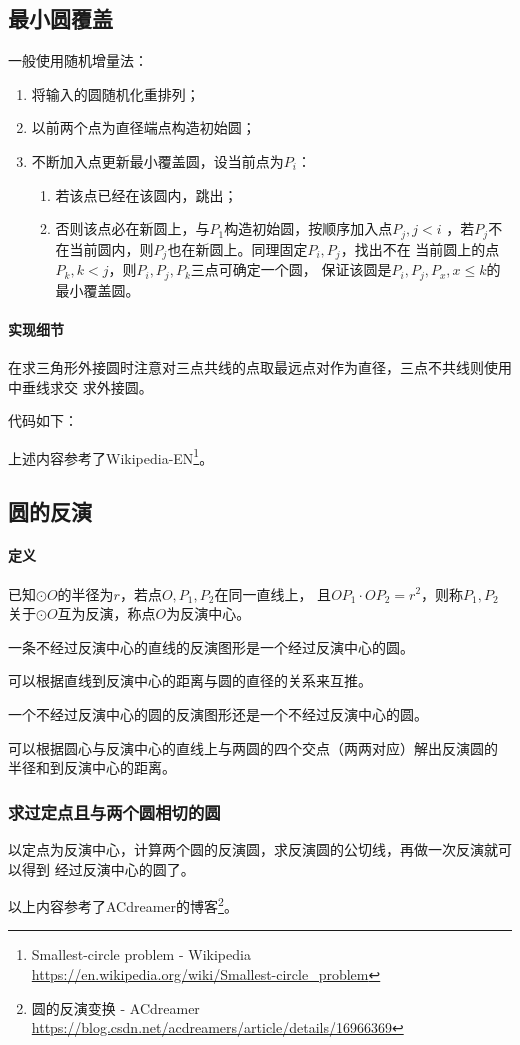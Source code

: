 \subsection{最小圆覆盖}
一般使用随机增量法：
\begin{enumerate}
	\item 将输入的圆随机化重排列；
	\item 以前两个点为直径端点构造初始圆；
	\item 不断加入点更新最小覆盖圆，设当前点为$P_i$：
	\begin{enumerate}
		\item 若该点已经在该圆内，跳出；
		\item 否则该点必在新圆上，与$P_1$构造初始圆，按顺序加入点$P_j,j<i$
		，若$P_j$不在当前圆内，则$P_j$也在新圆上。同理固定$P_i,P_j$，找出不在
		当前圆上的点$P_k,k<j$，则$P_i,P_j,P_k$三点可确定一个圆，
		保证该圆是$P_i,P_j,P_x,x\leq k$的最小覆盖圆。
	\end{enumerate}
\end{enumerate}

\paragraph{实现细节}
在求三角形外接圆时注意对三点共线的点取最远点对作为直径，三点不共线则使用中垂线求交
求外接圆。

代码如下：


上述内容参考了Wikipedia-EN\footnote{
	Smallest-circle problem - Wikipedia\\
	\url{https://en.wikipedia.org/wiki/Smallest-circle\_problem}
}。
\subsection{圆的反演}
\paragraph{定义} 已知$\odot O$的半径为$r$，若点$O,P_1,P_2$在同一直线上，
且$OP_1\cdot OP_2=r^2$，则称$P_1,P_2$关于$\odot O$互为反演，称点$O$为反演中心。

\begin{property}
	一条不经过反演中心的直线的反演图形是一个经过反演中心的圆。
\end{property}
可以根据直线到反演中心的距离与圆的直径的关系来互推。

\begin{property}
	一个不经过反演中心的圆的反演图形还是一个不经过反演中心的圆。
\end{property}
可以根据圆心与反演中心的直线上与两圆的四个交点（两两对应）解出反演圆的
半径和到反演中心的距离。

\subsubsection{求过定点且与两个圆相切的圆}
以定点为反演中心，计算两个圆的反演圆，求反演圆的公切线，再做一次反演就可以得到
经过反演中心的圆了。

以上内容参考了ACdreamer的博客\footnote{
	圆的反演变换 - ACdreamer
	\url{https://blog.csdn.net/acdreamers/article/details/16966369}
}。
